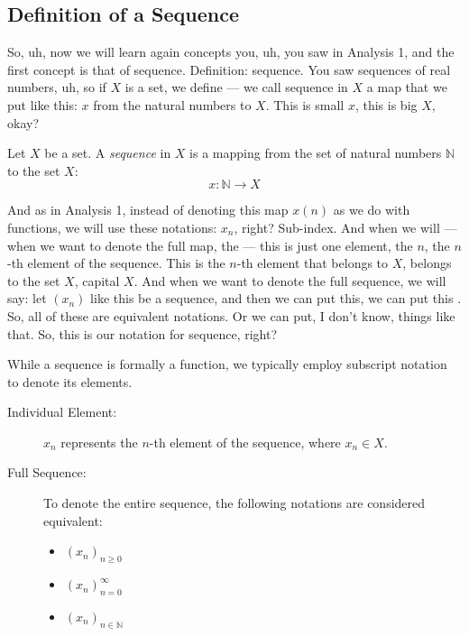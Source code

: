 \subsection{Definition of a Sequence}

\begin{spoken-clean}[00:00:50 - 00:01:50]
So, uh, now we will learn again concepts you, uh, you saw in Analysis 1, and the first concept is that of sequence.  Definition: sequence. You saw sequences of real numbers, uh, so if $X$ is a set, we define — we call sequence in $X$ a map that we put like this: $x$ from the natural numbers to $X$. This is small $x$, this is big $X$, okay?
\end{spoken-clean}

\begin{math-stroke}
\begin{definition}[Sequence]\label{def:sequence}
Let $X$ be a set. A \emph{sequence} in $X$ is a mapping from the set of natural numbers $\mathbb{N}$ to the set $X$:
\[ x: \mathbb{N} \to X \]
\end{definition}
\end{math-stroke}

\begin{spoken-clean}[00:01:50 - 00:03:00]
And as in Analysis 1, instead of denoting this map $x(n)$ as we do with functions, we will use these notations: $x_n$, right? Sub-index. And when we will — when we want to denote the full map, the — this is just one element, the $n$, the $n$-th element of the sequence. This is the $n$-th element that belongs to $X$, belongs to the set $X$, capital $X$. And when we want to denote the full sequence, we will say: let $(x_n)$ like this be a sequence, and then we can put this, we can put this . So, all of these are equivalent notations. Or we can put, I don't know, things like that. So, this is our notation for sequence, right?
\end{spoken-clean}

\begin{math-stroke}
While a sequence is formally a function, we typically employ subscript notation to denote its elements.
\begin{description}
    \item[Individual Element:] $x_n$ represents the $n$-th element of the sequence, where $x_n \in X$.
    \item[Full Sequence:] To denote the entire sequence, the following notations are considered equivalent:
    \begin{itemize}
        \item $(x_n)_{n \ge 0}$
        \item $(x_n)_{n=0}^{\infty}$
        \item $(x_n)_{n \in \mathbb{N}}$
    \end{itemize}
\end{description}
\end{math-stroke}

